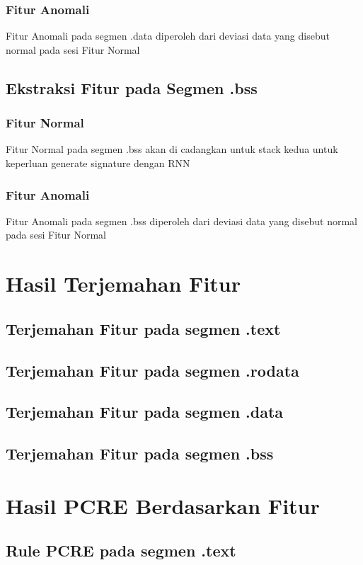 \documentclass{article}
\begin{document}
\subsubsection{Fitur Anomali}
Fitur Anomali pada segmen .data diperoleh dari deviasi data yang disebut normal pada sesi Fitur Normal
\subsection{Ekstraksi Fitur pada Segmen .bss}
\subsubsection{Fitur Normal}
Fitur Normal pada segmen .bss akan di cadangkan untuk stack kedua untuk keperluan generate signature dengan RNN
\subsubsection{Fitur Anomali}
Fitur Anomali pada segmen .bss diperoleh dari deviasi data yang disebut normal pada sesi Fitur Normal
\section{Hasil Terjemahan Fitur}
\subsection{Terjemahan Fitur pada segmen .text}

\subsection{Terjemahan Fitur pada segmen .rodata}

\subsection{Terjemahan Fitur pada segmen .data}

\subsection{Terjemahan Fitur pada segmen .bss}

\section{Hasil PCRE Berdasarkan Fitur}
\subsection{Rule PCRE pada segmen .text}
\end{document}
